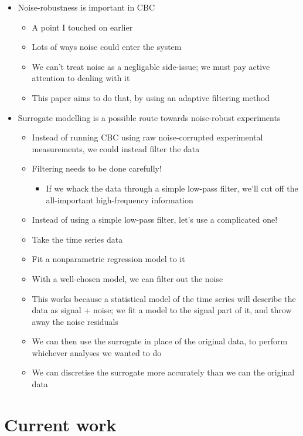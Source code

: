\documentclass[11pt]{article}
\begin{document}
\begin{itemize}
\item Noise-robustness is important in CBC
\begin{itemize}
\item A point I touched on earlier
\item Lots of ways noise could enter the system
\item We can't treat noise as a negligable side-issue; we must pay active attention to dealing with it
\item This paper aims to do that, by using an adaptive filtering method
\end{itemize}

\item Surrogate modelling is a possible route towards noise-robust experiments
\begin{itemize}
\item Instead of running CBC using raw noise-corrupted experimental measurements, we could instead filter the data
\item Filtering needs to be done carefully!
\begin{itemize}
\item If we whack the data through a simple low-pass filter, we'll cut off the all-important high-frequency information
\end{itemize}
\item Instead of using a simple low-pass filter, let's use a complicated one!
\item Take the time series data
\item Fit a nonparametric regression model to it
\item With a well-chosen model, we can filter out the noise
\item This works because a statistical model of the time series will describe the data as signal + noise; we fit a model to the signal part of it, and throw away the noise residuals
\item We can then use the surrogate in place of the original data, to perform whichever analyses we wanted to do
\item We can discretise the surrogate more accurately than we can the original data
\end{itemize}
\end{itemize}

\section{Current work}
\label{sec:orgd2f495b}
\end{document}

